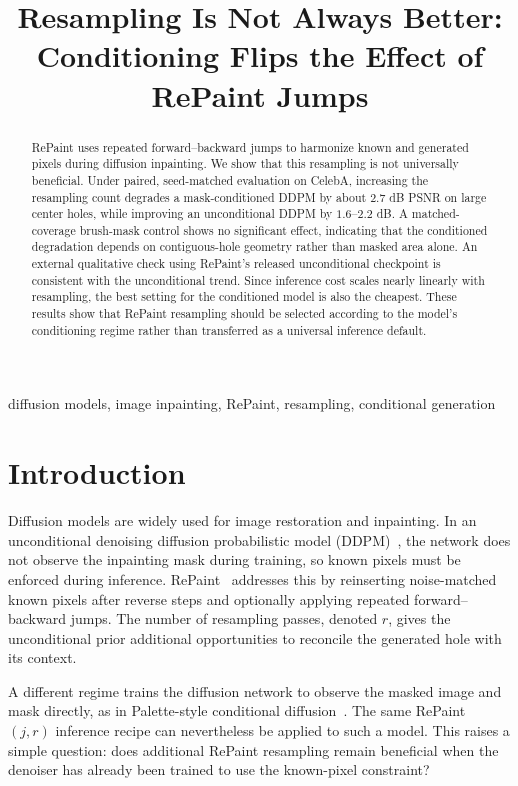 \documentclass{article}
\title{Resampling Is Not Always Better: Conditioning Flips the Effect of RePaint Jumps}
\begin{document}
\ninept
\maketitle

\begin{abstract}
RePaint uses repeated forward--backward jumps to harmonize known and generated pixels during diffusion inpainting. We show that this resampling is not universally beneficial. Under paired, seed-matched evaluation on CelebA, increasing the resampling count degrades a mask-conditioned DDPM by about $2.7$ dB PSNR on large center holes, while improving an unconditional DDPM by $1.6$--$2.2$ dB. A matched-coverage brush-mask control shows no significant effect, indicating that the conditioned degradation depends on contiguous-hole geometry rather than masked area alone. An external qualitative check using RePaint's released unconditional checkpoint is consistent with the unconditional trend. Since inference cost scales nearly linearly with resampling, the best setting for the conditioned model is also the cheapest. These results show that RePaint resampling should be selected according to the model's conditioning regime rather than transferred as a universal inference default.
\end{abstract}

\begin{keywords}
diffusion models, image inpainting, RePaint, resampling, conditional generation
\end{keywords}


\section{Introduction}
\label{sec:intro}

Diffusion models are widely used for image restoration and inpainting.
In an unconditional denoising diffusion probabilistic model (DDPM)~\cite{ho2020ddpm},
the network does not observe the inpainting mask during training, so known pixels
must be enforced during inference.
RePaint~\cite{lugmayr2022repaint} addresses this by reinserting noise-matched
known pixels after reverse steps and optionally applying repeated forward--backward
jumps. The number of resampling passes, denoted $r$, gives the unconditional
prior additional opportunities to reconcile the generated hole with its context.

A different regime trains the diffusion network to observe the masked image and
mask directly, as in Palette-style conditional diffusion~\cite{saharia2022palette}.
The same RePaint $(j,r)$ inference recipe can nevertheless be applied to such a
model. This raises a simple question: does additional RePaint resampling remain
beneficial when the denoiser has already been trained to use the known-pixel
constraint?
\end{document}
